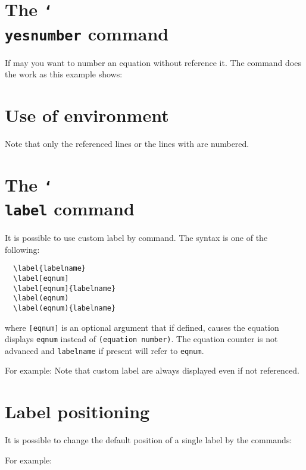 \documentclass[a4paper,final,11pt]{article}
\begin{document}
\section{The \texttt{\char`\\yesnumber} command}
If may you want to number an equation without reference it.
The  command does the work as this example shows:




\section{Use of  environment}
Note that only the referenced lines or the lines with 
 are numbered.


\section{The \texttt{\char`\\label} command}
It is possible to use custom label by  command. 
The syntax is one of the following:
\begin{verbatim}
  \label{labelname}
  \label[eqnum]
  \label[eqnum]{labelname}
  \label(eqnum)
  \label(eqnum){labelname}
\end{verbatim}
where \verb|[eqnum]| is an optional argument that if defined,
causes the equation displays \verb|eqnum| instead of
\verb'(equation number)'.  The equation counter is not advanced and
\verb'labelname' if present will refer to \verb'eqnum'.

For example:
Note that custom label are always displayed even if
not referenced.

\section{Label positioning}
It is possible to change the default position of a single 
label by the commands:
\begin{dotlist}
  \item{}
  \item{}
  \item{}
\end{dotlist}
For example:
\end{document}
